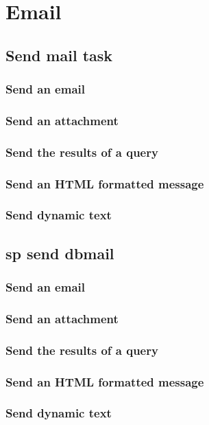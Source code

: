 \part{Email}
\chapter{Send mail task}
\section{Send an email}
\section{Send an attachment}
\section{Send the results of a query}
\section{Send an HTML formatted message}
\section{Send dynamic text}

\chapter{sp send dbmail}
\section{Send an email}
\section{Send an attachment}
\section{Send the results of a query}
\section{Send an HTML formatted message}
\section{Send dynamic text}